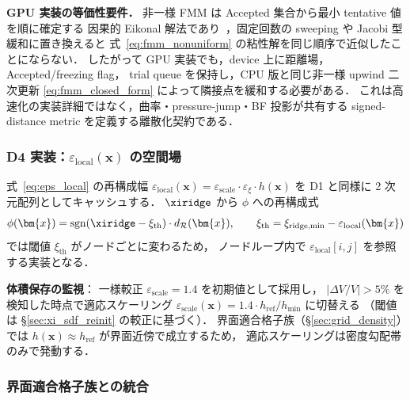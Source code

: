 \noindent\textbf{GPU 実装の等価性要件．}
非一様 FMM は Accepted 集合から最小 tentative 値を順に確定する
因果的 Eikonal 解法であり~\cite{Sethian1996}，固定回数の sweeping や Jacobi 型緩和に置き換えると
式~\eqref{eq:fmm_nonuniform} の粘性解を同じ順序で近似したことにならない．
したがって GPU 実装でも，device 上に距離場，Accepted/freezing flag，
trial queue を保持し，CPU 版と同じ非一様 upwind 二次更新
\eqref{eq:fmm_closed_form} によって隣接点を緩和する必要がある．
これは高速化の実装詳細ではなく，曲率・pressure-jump・BF 投影が共有する
signed-distance metric を定義する離散化契約である．

\subsubsection{\texorpdfstring{D4 実装：$\varepsilon_\text{local}(\bm{x})$ の空間場}{D4 実装：ε\_local(x) の空間場}}
\label{sec:ridge_nu_eps_impl}

式~\eqref{eq:eps_local} の再構成幅
$\varepsilon_\text{local}(\bm{x}) = \varepsilon_\text{scale}\cdot\varepsilon_\xi\cdot h(\bm{x})$ を
D1 と同様に 2 次元配列としてキャッシュする．
$\xiridge$ から $\phi$ への再構成式
\begin{equation*}
  \phi(\bm{x}) = \operatorname{sgn}(\xiridge - \xi_\text{th})\cdot d_\mathcal{R}(\bm{x}),
  \qquad \xi_\text{th} = \xi_\text{ridge,min} - \varepsilon_\text{local}(\bm{x})
\end{equation*}
では閾値 $\xi_\text{th}$ がノードごとに変わるため，
ノードループ内で $\varepsilon_\text{local}[i,j]$ を参照する実装となる．

\noindent\textbf{体積保存の監視}：
一様較正 $\varepsilon_\text{scale}=1.4$ を初期値として採用し，
$|\Delta V/V|>5\%$ を検知した時点で適応スケーリング
$\varepsilon_\text{scale}(\bm{x})=1.4\cdot h_\text{ref}/h_\text{min}$ に切替える
（閾値は \S\ref{sec:xi_sdf_reinit} の較正に基づく）．
界面適合格子族（\S\ref{sec:grid_density}）では
$h(\bm{x}) \approx h_\text{ref}$ が界面近傍で成立するため，
適応スケーリングは密度勾配帯のみで発動する．

\subsubsection{界面適合格子族との統合}
\label{sec:ridge_nu_interface_fitted}

